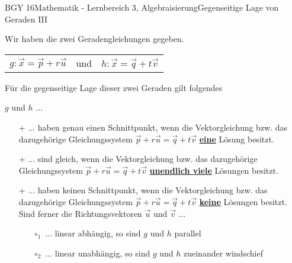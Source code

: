 \documentclass[oneside,openany,headings=optiontotoc,11pt,numbers=noenddot]{scrreprt}
\begin{document}
	\begin{worksheet}{BGY 16}{Mathematik - Lernbereich 3, Algebraisierung}{Gegenseitige Lage von Geraden III}
		
		\noindent
		Wir haben die zwei Geradengleichungen gegeben.
		\begin{center}
			\begin{tabularx}{\textwidth}{XcX}
				\(g: \vec{x} = \vec{p} + r\vec{u}\) & und & \(h: \vec{x} = \vec{q} + t\vec{v}\)
			\end{tabularx}
		\end{center}
		Für die gegenseitige Lage dieser zwei Geraden gilt folgendes
		\begin{framed}
			\noindent
			\(g\) und \(h\) \(\ldots\)
			\begin{itemize}
				\item[+] \(\ldots\) haben \color{codegreen}genau einen\normalcolor{} Schnittpunkt, wenn die Vektorgleichung bzw. das dazugehörige Gleichungssystem \(\vec{p} + r\vec{u} = \vec{q} + t\vec{v}\) \underline{\textbf{eine}} Lösung besitzt. 
				\item[+] \(\ldots\) sind \color{codegreen}gleich\normalcolor{}, wenn die Vektorgleichung bzw. das dazugehörige Gleichungssystem \(\vec{p} + r\vec{u} = \vec{q} + t\vec{v}\) \underline{\textbf{unendlich viele}} Lösungen besitzt.
				\item[+] \(\ldots\) haben \color{red}keinen\normalcolor{} Schnittpunkt, wenn die Vektorgleichung bzw. das dazugehörige Gleichungssystem \(\vec{p} + r\vec{u} = \vec{q} + t\vec{v}\) \underline{\textbf{keine}} Lösungen besitzt.\\
				Sind ferner die Richtungsvektoren \(\vec{u}\) und \(\vec{v}\) \(\ldots\)
				\begin{itemize}
					\item[\(\circ_1\)] \(\ldots\) linear \color{blue}abhängig\normalcolor{}, so sind \(g\) und \(h\) \color{red}parallel\normalcolor{}
					\item[\(\circ_2\)] \(\ldots\) linear \color{blue}unabhängig\normalcolor{}, so sind \(g\) und \(h\) zueinander \color{red}windschief\normalcolor{}
				\end{itemize}
			\end{itemize}
		\end{framed}
	\end{worksheet}
\end{document}
